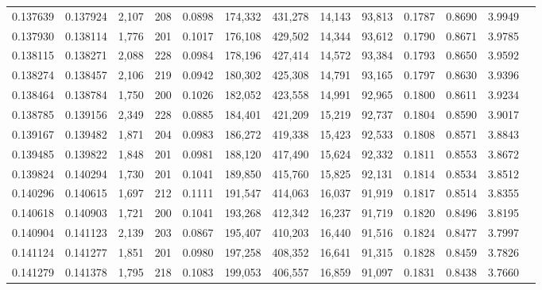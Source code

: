\begin{tabular}{rrrrrrrrrrrrr}
0.137639 & 0.137924 & 2,107 & 208 &                                     0.0898 & 174,332 & 431,278 &  14,143 &  93,813 & 0.1787 & 0.8690 & 3.9949 \\
0.137930 & 0.138114 & 1,776 & 201 &                                     0.1017 & 176,108 & 429,502 &  14,344 &  93,612 & 0.1790 & 0.8671 & 3.9785 \\
0.138115 & 0.138271 & 2,088 & 228 &                                     0.0984 & 178,196 & 427,414 &  14,572 &  93,384 & 0.1793 & 0.8650 & 3.9592 \\
0.138274 & 0.138457 & 2,106 & 219 &                                     0.0942 & 180,302 & 425,308 &  14,791 &  93,165 & 0.1797 & 0.8630 & 3.9396 \\
0.138464 & 0.138784 & 1,750 & 200 &                                     0.1026 & 182,052 & 423,558 &  14,991 &  92,965 & 0.1800 & 0.8611 & 3.9234 \\
0.138785 & 0.139156 & 2,349 & 228 &                                     0.0885 & 184,401 & 421,209 &  15,219 &  92,737 & 0.1804 & 0.8590 & 3.9017 \\
0.139167 & 0.139482 & 1,871 & 204 &                                     0.0983 & 186,272 & 419,338 &  15,423 &  92,533 & 0.1808 & 0.8571 & 3.8843 \\
0.139485 & 0.139822 & 1,848 & 201 &                                     0.0981 & 188,120 & 417,490 &  15,624 &  92,332 & 0.1811 & 0.8553 & 3.8672 \\
0.139824 & 0.140294 & 1,730 & 201 &                                     0.1041 & 189,850 & 415,760 &  15,825 &  92,131 & 0.1814 & 0.8534 & 3.8512 \\
0.140296 & 0.140615 & 1,697 & 212 &                                     0.1111 & 191,547 & 414,063 &  16,037 &  91,919 & 0.1817 & 0.8514 & 3.8355 \\
0.140618 & 0.140903 & 1,721 & 200 &                                     0.1041 & 193,268 & 412,342 &  16,237 &  91,719 & 0.1820 & 0.8496 & 3.8195 \\
0.140904 & 0.141123 & 2,139 & 203 &                                     0.0867 & 195,407 & 410,203 &  16,440 &  91,516 & 0.1824 & 0.8477 & 3.7997 \\
0.141124 & 0.141277 & 1,851 & 201 &                                     0.0980 & 197,258 & 408,352 &  16,641 &  91,315 & 0.1828 & 0.8459 & 3.7826 \\
0.141279 & 0.141378 & 1,795 & 218 &                                     0.1083 & 199,053 & 406,557 &  16,859 &  91,097 & 0.1831 & 0.8438 & 3.7660 \\

\end{tabular}
